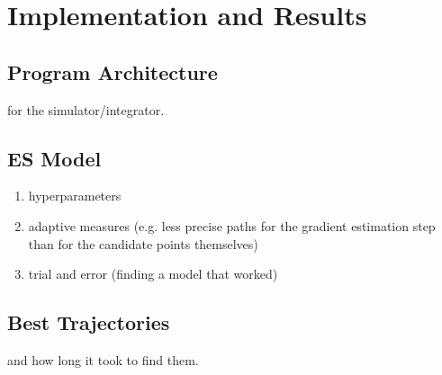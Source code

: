
\chapter{Implementation and Results}

\section{Program Architecture}
for the simulator/integrator.

\section{ES Model}

\begin{enumerate}
    \item hyperparameters
    \item adaptive measures (e.g. less precise paths for the gradient estimation step than for the candidate points themselves)
    \item trial and error (finding a model that worked)
\end{enumerate}

\section{Best Trajectories}
and how long it took to ﬁnd them.